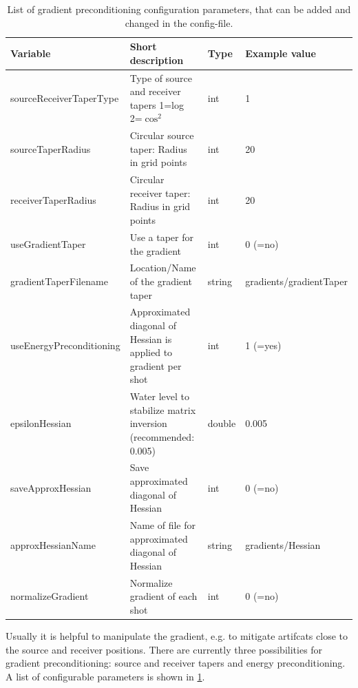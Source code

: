 \documentclass[pdftex,a4paper,parskip,listof=totoc,bibliography=totoc,onehalfspacing,12pt]{scrreprt}
\begin{document}
\begin{table}[h!]
\caption[List of gradient preconditioning configuration parameters.]{List of gradient preconditioning configuration parameters, that can be added and changed in the config-file.}\label{tab:config_precon}
\centering
\begin{adjustbox}{width=1\textwidth,center=\textwidth}
	\begin{tabular}{llll}
	\toprule
         Variable                 & Short description                                                   & Type   & Example value \\
	\midrule
	 sourceReceiverTaperType  & Type of source and receiver tapers 1=log 2=$\cos^2$                 &  int   & 1 \\
         sourceTaperRadius        & Circular source taper: Radius in grid points                        &  int   & 20 \\ 
         receiverTaperRadius      & Circular receiver taper: Radius in grid points                      &  int   & 20 \\
         useGradientTaper         & Use a taper for the gradient                                        &  int   & 0 (=no) \\
         gradientTaperFilename    & Location/Name of the gradient taper                                 & string & gradients/gradientTaper \\
         useEnergyPreconditioning & Approximated diagonal of Hessian is applied to gradient per shot    &  int   & 1 (=yes) \\ 
         epsilonHessian           & Water level to stabilize matrix inversion (recommended: 0.005)      & double & 0.005 \\      
         saveApproxHessian        & Save approximated diagonal of Hessian                               &  int   & 0 (=no) \\
         approxHessianName        & Name of file for approximated diagonal of Hessian                   & string & gradients/Hessian \\
         normalizeGradient        & Normalize gradient of each shot                                     &  int   & 0 (=no) \\
	\bottomrule
	\end{tabular}
	\end{adjustbox}
\end{table}

Usually it is helpful to manipulate the gradient, e.g. to mitigate artifcats close to the source and receiver positions. There are currently three possibilities for gradient preconditioning: source and receiver tapers and energy preconditioning. A list of configurable parameters is shown in \ref{tab:config_precon}.
\end{document}
